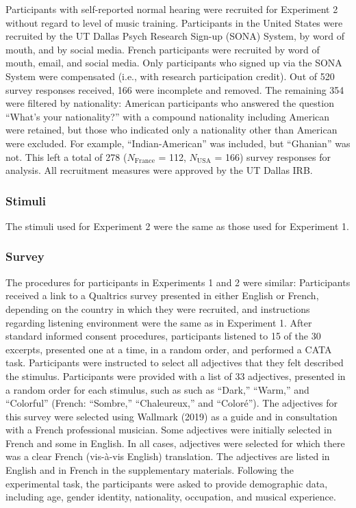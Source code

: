\documentclass[
  english,
  man]{apa6}
\begin{document}
Participants with self-reported normal hearing were recruited for Experiment 2 without regard to level of music training. Participants in the United States were recruited by the UT Dallas Psych Research Sign-up (SONA) System, by word of mouth, and by social media. French participants were recruited by word of mouth, email, and social media. Only participants who signed up via the SONA System were compensated (i.e., with research participation credit). Out of 520 survey responses received, 166 were incomplete and removed. The remaining 354 were filtered by nationality: American participants who answered the question ``What's your nationality?'' with a compound nationality including American were retained, but those who indicated only a nationality other than American were excluded. For example, ``Indian-American'' was included, but ``Ghanian'' was not. This left a total of 278 (\(N\mathrm{_{France}}\) = 112, \(N\mathrm{_{USA}}\) = 166) survey responses for analysis. All recruitment measures were approved by the UT Dallas IRB.

\hypertarget{stimuli-1}{%
\subsubsection{Stimuli}\label{stimuli-1}}

The stimuli used for Experiment 2 were the same as those used for Experiment 1.

\hypertarget{survey-1}{%
\subsubsection{Survey}\label{survey-1}}

The procedures for participants in Experiments 1 and 2 were similar: Participants received a link to a Qualtrics survey presented in either English or French, depending on the country in which they were recruited, and instructions regarding listening environment were the same as in Experiment 1. After standard informed consent procedures, participants listened to 15 of the 30 excerpts, presented one at a time, in a random order, and performed a CATA task. Participants were instructed to select all adjectives that they felt described the stimulus. Participants were provided with a list of 33 adjectives, presented in a random order for each stimulus, such as such as ``Dark,'' ``Warm,'' and ``Colorful'' (French: ``Sombre,'' ``Chaleureux,'' and ``Coloré''). The adjectives for this survey were selected using Wallmark (2019) as a guide and in consultation with a French professional musician. Some adjectives were initially selected in French and some in English. In all cases, adjectives were selected for which there was a clear French (vis-à-vis English) translation. The adjectives are listed in English and in French in the supplementary materials. Following the experimental task, the participants were asked to provide demographic data, including age, gender identity, nationality, occupation, and musical experience.
\end{document}
